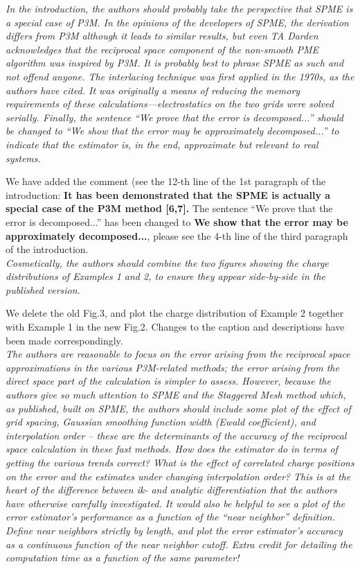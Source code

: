 \documentclass[a4paper]{article}
\begin{document}
\textit{ In the introduction, the authors should probably take the
  perspective that SPME is a special case of P3M.  In the opinions of
  the developers of SPME, the derivation differs from P3M although it
  leads to similar results, but even TA Darden acknowledges that the
  reciprocal space component of the non-smooth PME algorithm was
  inspired by P3M.  It is probably best to phrase SPME as such and not
  offend anyone.  The interlacing technique was first applied in the
  1970s, as the authors have cited.  It was originally a means of
  reducing the memory requirements of these
  calculations—electrostatics on the two grids were solved serially.
  Finally, the sentence ``We prove that the error is decomposed...''
  should be changed to ``We show that the error may be approximately
  decomposed...'' to indicate that the estimator is, in the end,
  approximate but relevant to real systems.
}

We have added the comment (see the 12-th line of the 1st paragraph
of the introduction:
\textbf{It has been demonstrated that the SPME is actually
  a special case of the P3M method [6,7].}
The sentence ``We prove that the error is decomposed...'' has been
changed to \textbf{We show that the error may be approximately
  decomposed...}, please see the 4-th line of the third paragraph of the
introduction.
\\

\textit{ Cosmetically, the authors should combine the two figures
  showing the charge distributions of Examples 1 and 2, to ensure they
  appear side-by-side in the published version.
}

We delete the old Fig.3,
and plot the charge distribution of Example 2 together
with Example 1 in the new Fig.2. Changes to the caption and
descriptions have been made correspondingly.\\

\textit{
The authors are reasonable to focus on the error arising from the
reciprocal space approximations in the various P3M-related methods;
the error arising from the direct space part of the calculation is
simpler to assess.  However, because the authors give so much
attention to SPME and the Staggered Mesh method which, as published,
built on SPME, the authors should include some plot of the effect of
grid spacing, Gaussian smoothing function width (Ewald coefficient),
and interpolation order -- these are the determinants of the accuracy of
the reciprocal space calculation in these fast methods.  How does the
estimator do in terms of getting the various trends correct?  What is
the effect of correlated charge positions on the error and the
estimates under changing interpolation order?  This is at the heart of
the difference between ik- and analytic differentiation that the
authors have otherwise carefully investigated.  It would also be
helpful to see a plot of the error estimator’s performance as a
function of the “near neighbor” definition.  Define near neighbors
strictly by length, and plot the error estimator's accuracy as a
continuous function of the near neighbor cutoff.  Extra credit for
detailing the computation time as a function of the same parameter!
}
\end{document}
